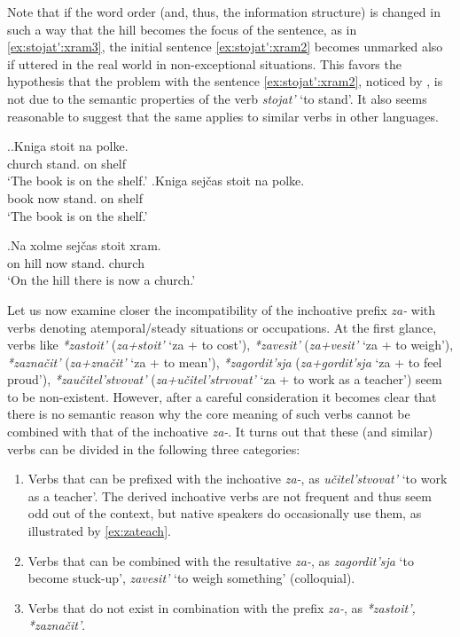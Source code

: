 Note that if the word order (and, thus, the information structure) is changed in such a way that the hill becomes the focus of the sentence, as in \ref{ex:stojat':xram3}, the initial sentence \ref{ex:stojat':xram2} becomes unmarked also if uttered in the real world in non-exceptional situations. This favors the hypothesis that the problem with the sentence \ref{ex:stojat':xram2}, noticed by \citet{Paducheva:96}, is not due to the semantic properties of the verb \textit{stojat'} `to stand'. It also seems reasonable to suggest that the same applies to similar verbs in other languages. 

\ex.\label{ex:stojat':kniga}\ag.Kniga stoit na polke.\\
church stand. on shelf\\
\vspace{0.5em}
`The book is on the shelf.'
\bg.Kniga sej\v{c}as stoit na polke.\\
book now stand. on shelf\\
\vspace{0.5em}
`The book is on the shelf.'

\exg.\label{ex:stojat':xram3}Na xolme sej\v{c}as stoit xram.\\
on hill now stand. church\\
\vspace{0.5em}
`On the hill there is now a church.'

Let us now examine closer the incompatibility of the inchoative prefix \textit{za-} with verbs denoting atemporal/steady situations or occupations. At the first glance, verbs like \textit{*zastoit'} (\textit{za+stoit'} `za + to cost'), \textit{*zavesit'} (\textit{za+vesit'} `za + to weigh'), \textit{*zazna\v{c}it'} (\textit{za+zna\v{c}it'} `za + to mean'), \textit{*zagordit'sja} (\textit{za+gordit'sja} `za + to feel proud'), \textit{*zau\v{c}itel'stvovat'} (\textit{za+u\v{c}itel'strvovat'} `za + to work as a teacher') seem to be non-existent. However, after a careful consideration it becomes clear that there is no semantic reason why the core meaning of such verbs cannot be combined with that of the inchoative \textit{za-}. It turns out that these (and similar) verbs can be divided in the following three categories:

\begin{enumerate}
\item Verbs that can be prefixed with the inchoative \textit{za-}, as \textit{u\v{c}itel'stvovat'} `to work as a teacher'. The derived inchoative verbs are not frequent and thus seem odd out of the context, but native speakers do occasionally use them, as illustrated by \ref{ex:zateach}.
\item Verbs that can be combined with the resultative \textit{za-}, as \textit{zagordit'sja} `to become stuck-up', \textit{zavesit'} `to weigh something' (colloquial).
\item Verbs that do not exist in combination with the prefix \textit{za-}, as \textit{*zastoit', *zazna\v{c}it'}.
\end{enumerate}

